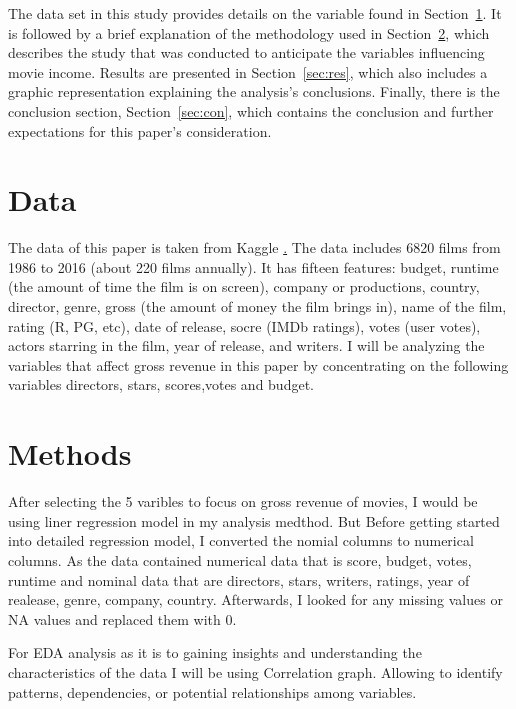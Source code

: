 \documentclass[12pt]{article}
\begin{document}
The data set in this study provides details on the variable found in Section~\ref{sec:data}.  
It is followed by a brief explanation of the methodology used in Section~\ref{sec:meth}, 
which describes the study that was conducted to anticipate the variables influencing movie 
income. Results are presented in Section~\ref{sec:res}, which also includes a graphic representation
explaining the analysis's conclusions. Finally, there is the conclusion section, 
Section~\ref{sec:con}, which contains the conclusion and further expectations for this
paper's consideration.

\section{Data}
\label{sec:data}

The data of this paper is taken from Kaggle \href{https://www.kaggle.com/datasets/danielgrijalvas/movies}. 
The data includes 6820 films from 1986 to 2016 (about 220 films annually). It has
fifteen features: budget, runtime (the amount of time the film is on screen), company 
or productions, country, director, genre, gross (the amount of money the film brings in), 
name of the film, rating (R, PG, etc), date of release, socre (IMDb ratings), votes (user votes), actors starring in the
film, year of release, and writers. I will be analyzing the variables that affect
gross revenue in this paper by concentrating on the following variables directors, stars, scores,votes and budget.

\section{Methods}
\label{sec:meth}

After selecting the 5 varibles to focus on gross revenue of movies, I would be using
liner regression model in my analysis medthod. But Before getting started into detailed 
regression model, I converted the nomial columns to numerical columns. As the data contained 
numerical data that is score, budget, votes, runtime and nominal data that are directors, 
stars, writers, ratings, year of realease, genre, company, country. Afterwards, I looked 
for any missing values or NA values and replaced them with 0.

For EDA analysis as it is to gaining insights and understanding the characteristics 
of the data I will be using Correlation graph. Allowing to identify patterns, dependencies,
or potential relationships among variables.
\end{document}
